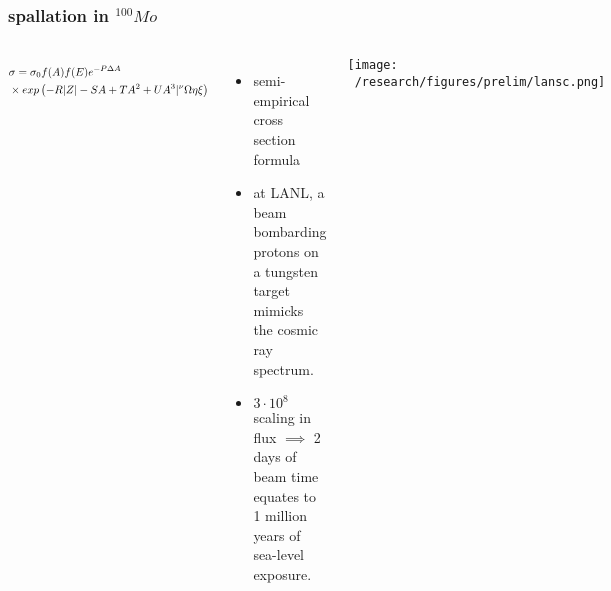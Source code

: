 \documentclass{beamer}
\begin{document}

	\begin{frame}
		\frametitle{spallation in $^{100}Mo$}
		\begin{columns}[c] %
			
			\begin{equation*}
			\resizebox{5cm}{!}{$
			\begin{split}
			& \sigma = \sigma_0 f(A)f(E)e^{-P\Delta A} \\
			& \times exp\left(-R|Z| -SA +TA^2 + UA^3|^{\nu} \Omega\eta\xi\right)
			\end{split}$}
			\end{equation*}
			
			\begin{itemize}
				\setlength\itemsep{2em}
				\item semi-empirical cross section formula
				\item at LANL, a beam bombarding protons on a tungsten target mimicks the cosmic ray spectrum.
				\item $3\cdot 10^8 $ scaling in flux $\implies$ 2 days of beam time equates to 1 million years of sea-level exposure.
			\end{itemize}
			
			\hspace*{-0.4cm}\texttt{[image: ~/research/figures/prelim/lansc.png]}
			\begin{center}
			\end{center}
			
		\end{columns}
	\end{frame}
\end{document}
